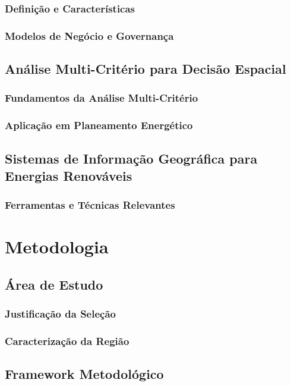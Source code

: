 \documentclass[12pt, a4paper]{article}
\begin{document}
\subsubsection{Definição e Características}
\subsubsection{Modelos de Negócio e Governança}

\subsection{Análise Multi-Critério para Decisão Espacial}
\subsubsection{Fundamentos da Análise Multi-Critério}
\subsubsection{Aplicação em Planeamento Energético}

\subsection{Sistemas de Informação Geográfica para Energias Renováveis}
\subsubsection{Ferramentas e Técnicas Relevantes}

\section{Metodologia}
\subsection{Área de Estudo}
\subsubsection{Justificação da Seleção}
\subsubsection{Caracterização da Região}

\subsection{Framework Metodológico}
\end{document}
